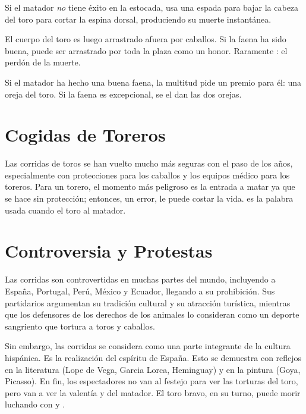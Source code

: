 Si el matador \emph{no} tiene éxito en la estocada, usa una espada para bajar la cabeza del toro para cortar la espina dorsal, produciendo su muerte instantánea.

El cuerpo del toro es luego arrastrado afuera por caballos. Si la faena ha sido buena, puede ser arrastrado por toda la plaza como un honor. Raramente : el perdón de la muerte.

Si el matador ha hecho una buena faena, la multitud pide un premio para él: una oreja del toro. Si la faena es excepcional, se el dan las dos orejas.


\section*{Cogidas de Toreros}
%
Las corridas de toros se han vuelto mucho más seguras con el paso de los años, especialmente con protecciones para los caballos y los equipos médico para los toreros. Para un torero, el momento más peligroso es la entrada a matar ya que se hace sin protección; entonces, un error, le puede costar la vida.  es la palabra usada cuando el toro  al matador.


\section*{Controversia y Protestas}
%
Las corridas son controvertidas en muchas partes del mundo, incluyendo a España, Portugal, Perú, México y Ecuador, llegando a su prohibición. Sus partidarios argumentan su tradición cultural y su atracción turística, mientras que los defensores de los derechos de los animales lo consideran como un deporte sangriento que tortura a toros y caballos.

Sin embargo, las corridas se considera como una parte integrante de la cultura hispánica. Es la realización del espíritu de España. Esto se demuestra con reflejos en la literatura (Lope de Vega, Garcia Lorca, Heminguay) y en la pintura (Goya, Picasso). En fin, los espectadores no van al festejo para ver las torturas del toro, pero van a ver la valentía y  del matador. El toro bravo, en su turno, puede morir luchando con  y .
